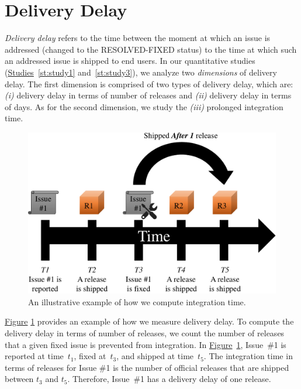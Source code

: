 \section{Delivery Delay}\label{ch2:deliverydelay}

{\em Delivery delay} refers to the time between the moment at which an issue is
addressed (\ie changed to the RESOLVED-FIXED status) to the time at which such
an addressed issue is shipped to end users. In our quantitative studies
(\hyperref[st:study1]{Studies}~\ref{st:study1} and~\ref{st:study3}), we analyze
two {\em dimensions} of delivery delay. The first dimension is comprised of two
types of delivery delay, which are: {\em (i)} delivery delay in terms of number
of releases and {\em (ii)} delivery delay in terms of days. As for the second
dimension, we study the {\em (iii)} prolonged integration time.

\begin{figure}
	\centering
	\includegraphics[width=.80\textwidth,keepaspectratio]
	{chapters/chapter2/figures/integration_delay_releases.pdf}
	\caption{An illustrative example of how we compute integration time.}
	\label{fig:integration_delay_releases}
\end{figure}

\hyperref[fig:integration_delay_releases]{Figure}
\ref{fig:integration_delay_releases} provides an example of how we measure
delivery delay. To compute the delivery delay in terms of number of releases, we
count the number of releases that a given fixed issue is prevented from
integration. In
\hyperref[fig:integration_delay_releases]{Figure}~\ref{fig:integration_delay_releases},
Issue~\#1 is reported at time~{\em $t_1$}, fixed at~{\em $t_3$}, and shipped at
time~{\em $t_5$}. The integration time in terms of releases for Issue \#1 is the
number of official releases that are shipped between {\em $t_3$} and {\em
$t_5$}. Therefore, Issue~\#1 has a delivery delay of one release. 

